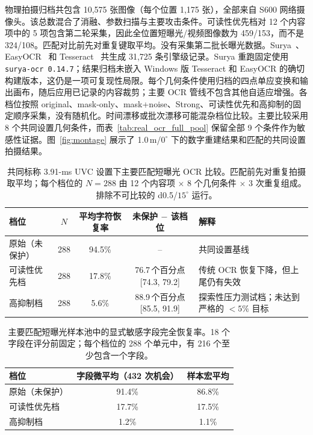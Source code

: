 \documentclass{ieeeaccess}
\begin{document}
物理拍摄归档共包含 10,575 张图像（每个位置 1,175 张），全部来自 S600 网络摄像头。该总数混合了消融、参数扫描与主要攻击条件。可读性优先档对 12 个内容项中的 5 项包含第二轮采集，因此全位置短曝光/视频图像数为 459/153，而不是 324/108。匹配对比前先对重复键取平均。没有采集第二批长曝光数据。Surya~\cite{b_surya2024}、EasyOCR~\cite{b_easyocr2020} 和 Tesseract~\cite{b_smith2007} 共生成 31,725 条引擎级记录。Surya 重跑固定使用 \texttt{surya-ocr 0.14.7}；结果归档未嵌入 Windows 版 Tesseract 和 EasyOCR 的确切构建版本，这仍是一项可复现性局限。每个几何条件使用归档的四点单应变换和输出画布，随后应用已记录的内容裁剪；主要 OCR 管线不包含其他自适应增强。各档位按照 original、mask-only、mask+noise、Strong、可读性优先和高抑制的固定顺序采集，没有随机化。时间漂移或批次漂移可能混杂档位比较。主要比较采用 8 个共同设置几何条件，而表~\ref{tab:real_ocr_full_pool} 保留全部 9 个条件作为敏感性证据。图~\ref{fig:montage} 展示了 1.0\,m/$0^{\circ}$ 下的数字重建结果和匹配的共同设置拍摄结果。

\begin{table}[!t]
\caption{共同标称 3.91-ms UVC 设置下主要匹配短曝光 OCR 比较。匹配前先对重复拍摄取平均；每个档位的 $N=288$ 由 12 个内容项 $\times$ 8 个几何条件 $\times$ 3 次重复组成。排除不可比较的 d0.5/$15^{\circ}$ 运行。}
\label{tab:real_ocr_common}
\centering
\footnotesize
\setlength{\tabcolsep}{4.6pt}
\begin{tabular}{lcccl}
\toprule
档位 & $N$ & 平均字符恢复率 & 未保护 $-$ 该档位 & 解释 \\
\midrule
原始（未保护） & 288 & 94.5\% & -- & 共同设置基线 \\
可读性优先档 & 288 & 17.8\% & 76.7\,个百分点 [74.3, 79.2] & 传统 OCR 恢复下降，但上尾仍有失效 \\
高抑制档 & 288 & 5.6\% & 88.9\,个百分点 [85.5, 91.9] & 探索性压力测试档；未达到严格的 $<5\%$ 目标 \\
\bottomrule
\end{tabular}
\end{table}

\begin{table}[!t]
\caption{主要匹配短曝光样本池中的显式敏感字段完全恢复率。18 个字段在评分前固定；每个档位的 288 个单元中，有 216 个至少包含一个字段。}
\label{tab:explicit_fields}
\centering
\footnotesize
\begin{tabular}{lcc}
\toprule
档位 & 字段微平均（432 次机会） & 样本宏平均 \\
\midrule
原始（未保护） & 91.4\% & 86.8\% \\
可读性优先档 & 17.7\% & 17.5\% \\
高抑制档 & 1.2\% & 1.1\% \\
\bottomrule
\end{tabular}
\end{table}
\end{document}
